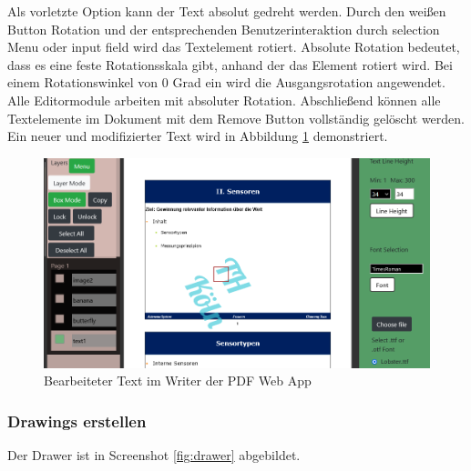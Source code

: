 Als vorletzte Option kann der Text absolut gedreht werden. Durch den weißen Button Rotation und der entsprechenden Benutzerinteraktion durch selection Menu oder input field wird das Textelement rotiert. Absolute Rotation bedeutet, dass es eine feste Rotationsskala gibt, anhand der das Element rotiert wird. Bei einem Rotationswinkel von 0 Grad ein wird die Ausgangsrotation angewendet. Alle Editormodule arbeiten mit absoluter Rotation. Abschließend können alle Textelemente im Dokument mit dem Remove Button vollständig gelöscht werden. Ein neuer und modifizierter Text wird in Abbildung \ref{fig:text} demonstriert.

\begin{figure}[!htbp]
	\centering
	\includegraphics[width=1\textwidth]{"images/text.png"}
	\caption{Bearbeiteter Text im Writer der PDF Web App}
	\label{fig:text}
\end{figure}

\subsubsection{Drawings erstellen}
Der Drawer ist in Screenshot \ref{fig:drawer} abgebildet. 

